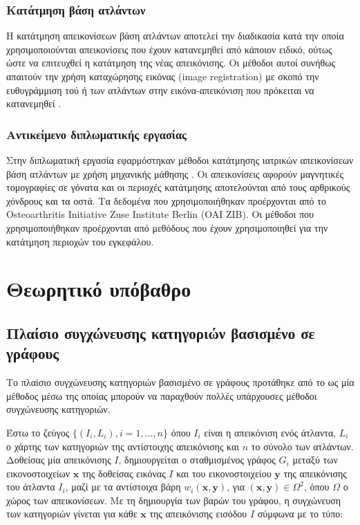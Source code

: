 \documentclass[a4paper,12pt]{article}
\begin{document}
\subsubsection{Κατάτμηση βάση ατλάντων}

Η κατάτμηση απεικονίσεων βάση ατλάντων αποτελεί την διαδικασία κατά την οποία
χρησιμοποιούνται απεικονίσεις που έχουν κατανεμηθεί από κάποιον ειδικό, ούτως
ώστε να επιτευχθεί η κατάτμηση της νέας απεικόνισης. Οι μέθοδοι αυτοί συνήθως
απαιτούν την χρήση καταχώρησης εικόνας (image registration) με σκοπό την
ευθυγράμμιση τού ή των ατλάντων στην εικόνα-απεικόνιση που πρόκειται να
κατανεμηθεί \cite{Registration_Segmentation:1}.

\subsubsection{Αντικείμενο διπλωματικής εργασίας}

Στην διπλωματική εργασία εφαρμόστηκαν μέθοδοι κατάτμησης ιατρικών απεικονίσεων
βάση ατλάντων με χρήση μηχανικής μάθησης \cite{Zhang:1} \cite{Tong:1}
\cite{Coupe:1}. Οι απεικονίσεις αφορούν μαγνητικές τομογραφίες σε γόνατα και οι
περιοχές κατάτμησης αποτελούνται από τους αρθρικούς χόνδρους και τα οστά. Τα
δεδομένα που χρησιμοποιήθηκαν προέρχονται από το Osteoarthritis Initiative Zuse
Institute Berlin (OAI ZIB). Οι μέθοδοι που χρησιμοποιήθηκαν προέρχονται από
μεθόδους που έχουν χρησιμοποιηθεί για την κατάτμηση περιοχών του εγκεφάλου.


\section{Θεωρητικό υπόβαθρο}

\subsection{Πλαίσιο συγχώνευσης κατηγοριών βασισμένο σε γράφους}
\label{Graph-Based_Framework:1}

Το πλαίσιο συγχώνευσης κατηγοριών βασισμένο σε γράφους προτάθηκε από
το \cite{Zhang:1} ως μία μέθοδος μέσω της οποίας μπορούν να παραχθούν πολλές
υπάρχουσες μέθοδοι συγχώνευσης κατηγοριών.

Έστω το ζεύγος $\{(I_i,L_i),i=1,...,n\}$ όπου $I_i$ είναι η απεικόνιση ενός
άτλαντα, $L_i$ ο χάρτης των κατηγοριών της αντίστοιχης απεικόνισης και $n$ το
σύνολο των ατλάντων. Δοθείσας μία απεικόνισης $I$, δημιουργείται ο σταθμισμένος
γράφος $G_i$ μεταξύ των εικονοστοιχείων $\bm{x}$ της δοθείσας εικόνας $I$ και
του εικονοστοιχείου $\bm{y}$ της απεικόνισης του άτλαντα $I_i$, μαζί με τα
αντίστοιχα βάρη $w_i(\bm{x},\bm{y})$, για $(\bm{x},\bm{y})\in\Omega^2$, όπου
$\Omega$ ο χώρος των απεικονίσεων. Με τη δημιουργία των βαρών του γράφου, η
συγχώνευση των κατηγοριών γίνεται για κάθε $\bm{x}$ της απεικόνισης εισόδου $I$
σύμφωνα με το τύπο:
\end{document}
